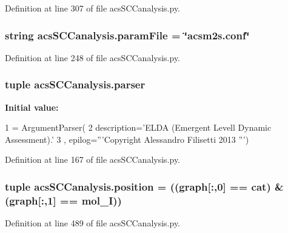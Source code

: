 Definition at line 307 of file acs\+S\+C\+Canalysis.\+py.

\hypertarget{a00130_a7160f8e48b4aafebbd75e9037fc9fef7}{
\subsubsection[{param\+File}]{\setlength{\rightskip}{0pt plus 5cm}string acs\+S\+C\+Canalysis.\+param\+File = \char`\"{}acsm2s.\+conf\char`\"{}}}\label{a00130_a7160f8e48b4aafebbd75e9037fc9fef7}


Definition at line 248 of file acs\+S\+C\+Canalysis.\+py.

\hypertarget{a00130_ae47150d99d4a8e7173bb73a271c4a740}{
\subsubsection[{parser}]{\setlength{\rightskip}{0pt plus 5cm}tuple acs\+S\+C\+Canalysis.\+parser}}\label{a00130_ae47150d99d4a8e7173bb73a271c4a740}
{\bfseries Initial value\+:}
\begin{DoxyCode}
1 = ArgumentParser(
2                                 description=\textcolor{stringliteral}{'ELDA (Emergent Levell Dynamic       Assessment).'}
3                                 , epilog=\textcolor{stringliteral}{'''Copyright Alessandro Filisetti 2013 '''})
\end{DoxyCode}


Definition at line 167 of file acs\+S\+C\+Canalysis.\+py.

\hypertarget{a00130_ac09e85f8df5b7c8c7d2caf87e9193421}{
\subsubsection[{position}]{\setlength{\rightskip}{0pt plus 5cm}tuple acs\+S\+C\+Canalysis.\+position = (({\bf graph}\mbox{[}\+:,0\mbox{]} == {\bf cat}) \& ({\bf graph}\mbox{[}\+:,1\mbox{]} == {\bf mol\+\_\+\+I}))}}\label{a00130_ac09e85f8df5b7c8c7d2caf87e9193421}


Definition at line 489 of file acs\+S\+C\+Canalysis.\+py.

